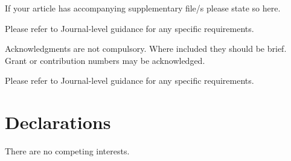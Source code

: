 \documentclass[sn-mathphys]{sn-jnl}%
\theoremstyle{thmstyleone}%
\theoremstyle{thmstyletwo}%
\theoremstyle{thmstylethree}%
\begin{document}
If your article has accompanying supplementary file/s please state so here. 

Please refer to Journal-level guidance for any specific requirements.


Acknowledgments are not compulsory. Where included they should be brief. Grant or contribution numbers may be acknowledged.

Please refer to Journal-level guidance for any specific requirements.

\section*{Declarations}

There are no competing interests.




\end{document}
